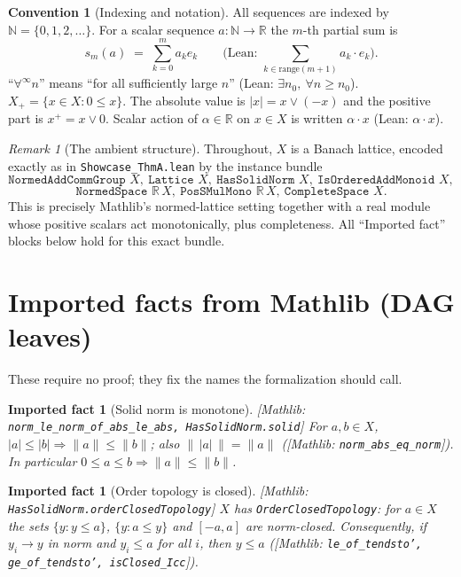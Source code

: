 \documentclass[11pt]{article}
\newcommand{\mlib}[1]{{\normalfont\scriptsize[\textsf{Mathlib:} \texttt{#1}]}}
\theoremstyle{definition}
\newtheorem{convention}[definition]{Convention}
\theoremstyle{plain}
\newtheorem{fact}[definition]{Imported fact}
\theoremstyle{remark}
\newtheorem{remark}[definition]{Remark}
\newcommand{\N}{\mathbb{N}}
\newcommand{\R}{\mathbb{R}}
\newcommand{\norm}[1]{\lVert #1\rVert}
\newcommand{\abs}[1]{\lvert #1\rvert}
\newcommand{\pos}[1]{{#1}^{+}}
\newcommand{\Xp}{X_{+}}
\newcommand{\act}{\cdot}
\begin{document}
\begin{convention}[Indexing and notation]\label{conv:index}
All sequences are indexed by \(\N=\{0,1,2,\dots\}\). For a scalar sequence
\(a:\N\to\R\) the \(m\)-th partial sum is
\[
  s_m(a)\;=\;\sum_{k=0}^{m} a_k e_k
  \qquad\text{(Lean: \(\textstyle\sum_{k\in\mathrm{range}(m+1)} a_k\act e_k\)).}
\]
``\(\forall^{\infty} n\)'' means ``for all sufficiently large \(n\)''
(Lean: \(\exists n_0,\ \forall n\ge n_0\)). \(\Xp=\{x\in X: 0\le x\}\).
The absolute value is \(\abs{x}=x\vee(-x)\) and the positive part is
\(\pos{x}=x\vee 0\). Scalar action of \(\alpha\in\R\) on \(x\in X\) is written
\(\alpha\act x\) (Lean: \(\alpha\act x\)).
\end{convention}

\begin{remark}[The ambient structure]\label{rem:structure}
Throughout, \(X\) is a Banach lattice, encoded exactly as in
\texttt{Showcase\_ThmA.lean} by the instance bundle
\[
  \texttt{NormedAddCommGroup } X,\ \texttt{Lattice } X,\
  \texttt{HasSolidNorm } X,\ \texttt{IsOrderedAddMonoid } X,
\]
\[
  \texttt{NormedSpace } \R\, X,\ \texttt{PosSMulMono } \R\, X,\
  \texttt{CompleteSpace } X .
\]
This is precisely Mathlib's normed-lattice setting together with a real module
whose positive scalars act monotonically, plus completeness. All ``Imported
fact'' blocks below hold for this exact bundle.
\end{remark}

\section{Imported facts from Mathlib (DAG leaves)}\label{sec:mathlib}

These require no proof; they fix the names the formalization should call.

\begin{fact}[Solid norm is monotone]\label{fact:solid}
\mlib{norm\_le\_norm\_of\_abs\_le\_abs, HasSolidNorm.solid}
For \(a,b\in X\), \(\abs{a}\le\abs{b}\Rightarrow \norm{a}\le\norm{b}\); also
\(\norm{\,\abs{a}\,}=\norm{a}\) (\mlib{norm\_abs\_eq\_norm}). In particular
\(0\le a\le b\Rightarrow \norm{a}\le\norm{b}\).
\end{fact}

\begin{fact}[Order topology is closed]\label{fact:orderclosed}
\mlib{HasSolidNorm.orderClosedTopology}
\(X\) has \texttt{OrderClosedTopology}: for \(a\in X\) the sets
\(\{y:y\le a\}\), \(\{y:a\le y\}\) and \([-a,a]\) are norm-closed. Consequently,
if \(y_i\to y\) in norm and \(y_i\le a\) for all \(i\), then \(y\le a\)
(\mlib{le\_of\_tendsto', ge\_of\_tendsto', isClosed\_Icc}).
\end{fact}
\end{document}
